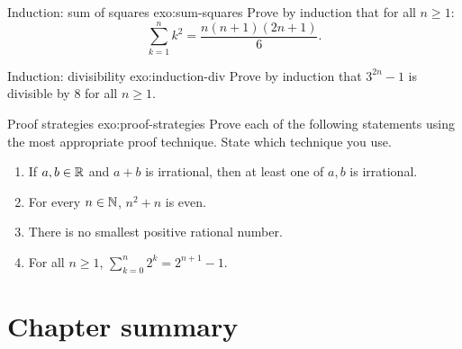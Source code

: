 \begin{exercise}{Induction: sum of squares \intermediate}{exo:sum-squares}
Prove by induction that for all $n\geq 1$:
\[
  \sum_{k=1}^{n}k^2 = \frac{n(n+1)(2n+1)}{6}.
\]
\end{exercise}

\begin{exercise}{Induction: divisibility \intermediate}{exo:induction-div}
Prove by induction that $3^{2n}-1$ is divisible by $8$ for all $n\geq 1$.
\end{exercise}

\begin{exercise}{Proof strategies \challenging}{exo:proof-strategies}
Prove each of the following statements using the most appropriate proof
technique. State which technique you use.
\begin{enumerate}[label=(\alph*)]
  \item If $a,b\in{\mathbb{R}}$ and $a+b$ is irrational, then at least one of
    $a,b$ is irrational.
  \item For every $n\in{\mathbb{N}}$, $n^2+n$ is even.
  \item There is no smallest positive rational number.
  \item For all $n\geq 1$, $\displaystyle\sum_{k=0}^{n}2^k = 2^{n+1}-1$.
\end{enumerate}
\end{exercise}


\section*{Chapter summary}\label{sec:ch0-summary}

